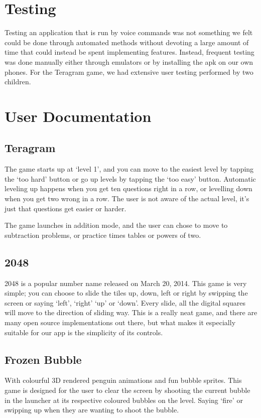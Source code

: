 \documentclass[11pt, oneside]{article}
\begin{document}
\section*{Testing}
Testing an application that is run by voice commands was not something
we felt could be done through automated methods without devoting a 
large amount of time that could instead be spent implementing features.
Instead, frequent testing was done manually either through emulators or 
by installing the apk on our own phones. For the Teragram game, we had 
extensive user testing performed by two children.
\pagebreak

\section*{User Documentation}

\subsection*{Teragram}
The game starts up at `level 1', and you can move to the easiest level
by tapping the `too hard' button or go up levels by tapping the `too
easy' button. Automatic leveling up happens when you get ten
questions right in a row, or levelling down when you get two wrong in
a row. The user is not aware of the actual level, it's just that
questions get easier or harder.

The game launches in addition mode, and the user can chose to move to
subtraction problems, or practice times tables or powers of two.

\subsection*{2048}
2048 is a popular number name released on March 20, 2014. This game is
very simple; you can choose to slide the tiles up, down, left or right by
swipping the screen or saying `left', `right' `up' or `down'. Every
slide, all the digital squares will move to the direction of sliding
way. This is a really neat game, and there are many open source
implementations out there, but what makes it especially suitable for
our app is the simplicity of its controls.

\subsection*{Frozen Bubble}
With colourful 3D rendered penguin animations and fun bubble sprites. 
This game is designed for the user to clear the screen by shooting the 
current bubble in the launcher at its respective coloured bubbles on 
the level. Saying `fire' or swipping up when they are wanting to shoot
the bubble.  
\end{document}
